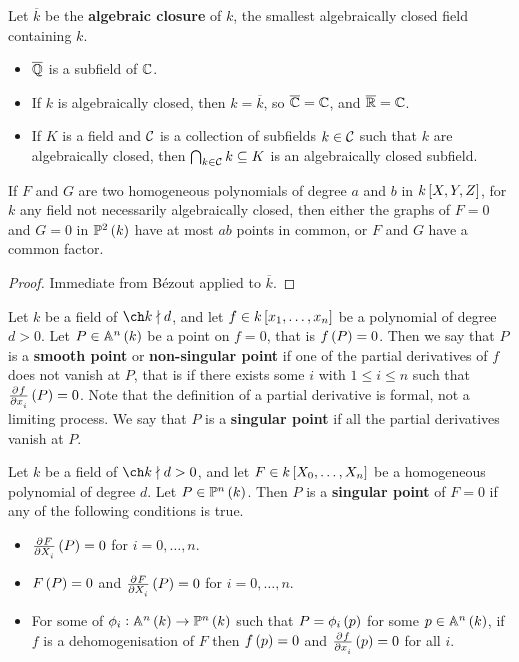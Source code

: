 Let $ \overline{k} $ be the \textbf{algebraic closure} of $ k $, the smallest algebraically closed field containing $ k $.

\begin{example*}
\hfill
\begin{itemize}
\item $ \overline{\mathbb{Q}} $ is a subfield of $ \mathbb{C} $.
\item If $ k $ is algebraically closed, then $ k = \overline{k} $, so $ \overline{\mathbb{C}} = \mathbb{C} $, and $ \overline{\mathbb{R}} = \mathbb{C} $.
\item If $ K $ is a field and $ \mathcal{C} $ is a collection of subfields $ k \in \mathcal{C} $ such that $ k $ are algebraically closed, then $ \bigcap_{k \in \mathcal{C}} k \subseteq K $ is an algebraically closed subfield.
\end{itemize}
\end{example*}

\begin{corollary}
If $ F $ and $ G $ are two homogeneous polynomials of degree $ a $ and $ b $ in $ k\sbr{X, Y, Z} $, for $ k $ any field not necessarily algebraically closed, then either the graphs of $ F = 0 $ and $ G = 0 $ in $ \PP^2\br{k} $ have at most $ ab $ points in common, or $ F $ and $ G $ have a common factor.
\end{corollary}

\begin{proof}
Immediate from B\'ezout applied to $ \overline{k} $.
\end{proof}

\begin{definition}
Let $ k $ be a field of $ \ch k \nmid d $, and let $ f \in k\sbr{x_1, \dots, x_n} $ be a polynomial of degree $ d > 0 $. Let $ P \in \AA^n\br{k} $ be a point on $ f = 0 $, that is $ f\br{P} = 0 $. Then we say that $ P $ is a \textbf{smooth point} or \textbf{non-singular point} if one of the partial derivatives of $ f $ does not vanish at $ P $, that is if there exists some $ i $ with $ 1 \le i \le n $ such that $ \tpd{f}{x_i}\br{P} = 0 $. Note that the definition of a partial derivative is formal, not a limiting process. We say that $ P $ is a \textbf{singular point} if all the partial derivatives vanish at $ P $.
\end{definition}

\begin{definition}
Let $ k $ be a field of $ \ch k \nmid d > 0 $, and let $ F \in k\sbr{X_0, \dots, X_n} $ be a homogeneous polynomial of degree $ d $. Let $ P \in \PP^n\br{k} $. Then $ P $ is a \textbf{singular point} of $ F = 0 $ if any of the following conditions is true.
\begin{itemize}
\item $ \tpd{F}{X_i}\br{P} = 0 $ for $ i = 0, \dots, n $.
\item $ F\br{P} = 0 $ and $ \tpd{F}{X_i}\br{P} = 0 $ for $ i = 0, \dots, n $.
\item For some of $ \phi_i : \AA^n\br{k} \to \PP^n\br{k} $ such that $ P = \phi_i\br{p} $ for some $ p \in \AA^n\br{k} $, if $ f $ is a dehomogenisation of $ F $ then $ f\br{p} = 0 $ and $ \tpd{f}{x_i}\br{p} = 0 $ for all $ i $.
\end{itemize}
\end{definition}


